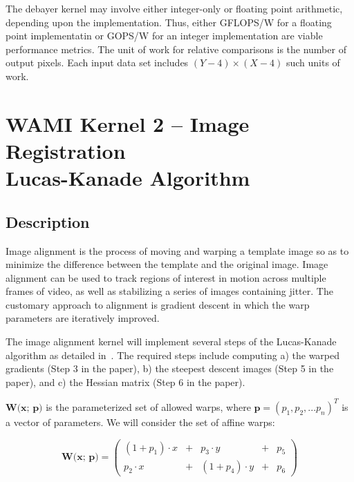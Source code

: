 \documentclass{report}
\begin{document}
The debayer kernel may involve either integer-only or floating point arithmetic,
depending upon the implementation.
Thus, either GFLOPS/W for a floating point implementatin or GOPS/W
for an integer implementation are viable performance metrics.
The unit of work for relative comparisons is the number of output pixels.
Each input data set includes $(Y-4) \times (X-4)$ such units of work.


\section{WAMI Kernel 2 -- Image Registration \\ Lucas-Kanade Algorithm}
\label{sec:wami:lucas_kanade}

\subsection{Description}

Image alignment is the process of moving and warping a template image so as
to minimize the difference between the template and the original image.
Image alignment can be used to track regions of interest in motion across
multiple frames of video, as well as stabilizing a series of images containing
jitter.  The customary approach to alignment is gradient descent in which the
warp parameters are iteratively improved.

The image alignment kernel will implement several steps of the Lucas-Kanade~\cite{LucasKanade81}
algorithm as detailed in~\cite{BakerMatthews04}.
The required steps include computing a) the warped gradients (Step 3 in the paper),
b) the steepest descent images (Step 5 in the paper),
and c) the Hessian matrix (Step 6 in the paper).

$\textbf{W(x; p)}$ is the parameterized set of allowed warps, where
$\textbf{p} = (p_{1}, p_{2}, ... p_{n})^{T}$ is a vector of parameters.
We will consider the set of affine warps:

\begin{equation}
 \textbf{W(x; p)} = \begin{pmatrix}
                     (1 + p_{1}) \cdot x & + & p_{3} \cdot y & + & p_{5} \\
                     p_{2} \cdot x & + & (1 + p_{4}) \cdot y & + & p_{6}
                    \end{pmatrix}
\label{eqn:warps}
\end{equation}
\end{document}
